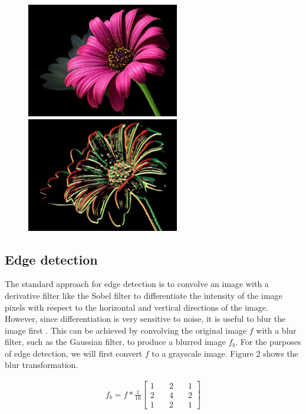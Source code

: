\documentclass{article}
\begin{document}
\begin{figure}[h!]
\centering
\includegraphics[height=5cm]{images/orig_4.jpg}
\hspace{0.4cm}
\includegraphics[height=5cm]{images/edge_color_4.jpg}
\end{figure}

\subsection{Edge detection}

The standard approach for edge detection is to convolve an image with a derivative filter like the Sobel filter to differentiate the intensity of the image pixels with respect to the horizontal and vertical directions of the image. However, since differentiation is very sensitive to noise, it is useful to blur the image first \cite{filtering_lecture}. This can be achieved by convolving the original image $f$ with a blur filter, such as the Gaussian filter, to produce a blurred image $f_b$. For the purposes of edge detection, we will first convert $f$ to a grayscale image. Figure 2 shows the blur transformation.

\begin{align}
f_b = f * \frac{1}{16} \begin{bmatrix} 
1 & \quad 2 & \quad 1 \\ 
2 & \quad 4 & \quad 2 \\ 
1 & \quad 2 & \quad 1  
\end{bmatrix}
\end{align}
\end{document}

